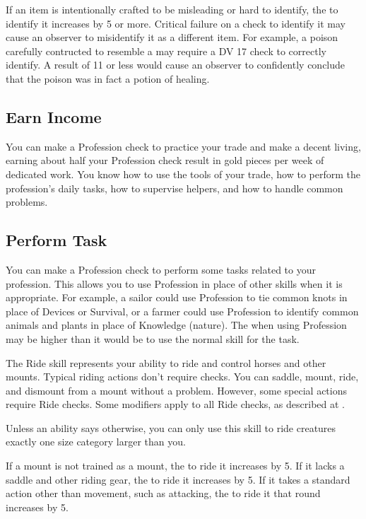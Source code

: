         If an item is intentionally crafted to be misleading or hard to identify, the  to identify it increases by 5 or more.
        Critical failure on a check to identify it may cause an observer to misidentify it as a different item.
        For example, a poison carefully contructed to resemble a  may require a DV 17 check to correctly identify.
        A result of 11 or less would cause an observer to confidently conclude that the poison was in fact a potion of healing.

    \subsection{Earn Income}
        You can make a Profession check to practice your trade and make a decent living, earning about half your Profession check result in gold pieces per week of dedicated work. You know how to use the tools of your trade, how to perform the profession's daily tasks, how to supervise helpers, and how to handle common problems.

    \subsection{Perform Task}
        You can make a Profession check to perform some tasks related to your profession. This allows you to use Profession in place of other skills when it is appropriate. For example, a sailor could use Profession to tie common knots in place of Devices or Survival, or a farmer could use Profession to identify common animals and plants in place of Knowledge (nature). The  when using Profession may be higher than it would be to use the normal skill for the task.

\newpage
{}
    The Ride skill represents your ability to ride and control horses and other mounts.
    Typical riding actions don't require checks. You can saddle, mount, ride, and dismount from a mount without a problem. However, some special actions require Ride checks. Some modifiers apply to all Ride checks, as described at .

    Unless an ability says otherwise, you can only use this skill to ride creatures exactly one size category larger than you.

    \label{Ride Modifiers}
    If a mount is not trained as a mount, the  to ride it increases by 5.
    If it lacks a saddle and other riding gear, the  to ride it increases by 5.
    If it takes a standard action other than movement, such as attacking, the  to ride it that round increases by 5.

